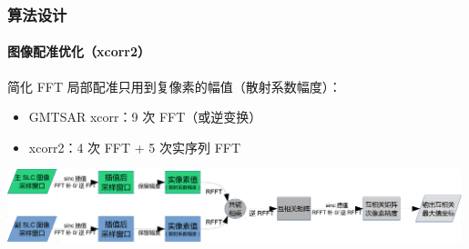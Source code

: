 \documentclass{beamer}
\begin{document}
\begin{frame}
    \frametitle{算法设计}
    \framesubtitle{图像配准优化（xcorr2）}

    \begin{block}{简化 FFT}
        局部配准只用到复像素的幅值（散射系数幅度）：
        \begin{itemize}
            \item GMTSAR xcorr：9 次 FFT（或逆变换）
            \item xcorr2：4 次 FFT + 5 次实序列 FFT
        \end{itemize}
        \includegraphics[width=0.99\textwidth]{figures/xcorr2-crop.pdf}
    \end{block}
\end{frame}
\end{document}
